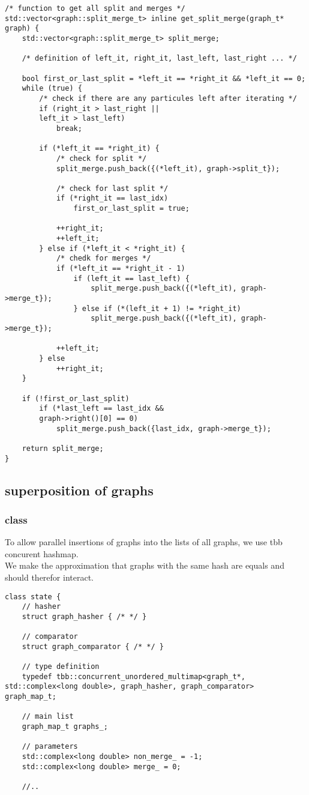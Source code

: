 \documentclass[11pt]{article}
\begin{document}
\begin{lstlisting}[style=CStyle]
/* function to get all split and merges */
std::vector<graph::split_merge_t> inline get_split_merge(graph_t* graph) {
	std::vector<graph::split_merge_t> split_merge;

	/* definition of left_it, right_it, last_left, last_right ... */
	
	bool first_or_last_split = *left_it == *right_it && *left_it == 0;
	while (true) {
		/* check if there are any particules left after iterating */
		if (right_it > last_right ||
		left_it > last_left)
			break;

		if (*left_it == *right_it) {
			/* check for split */
			split_merge.push_back({(*left_it), graph->split_t});

			/* check for last split */
			if (*right_it == last_idx)
				first_or_last_split = true;

			++right_it;
			++left_it;
		} else if (*left_it < *right_it) {
			/* chedk for merges */
			if (*left_it == *right_it - 1)
				if (left_it == last_left) {
					split_merge.push_back({(*left_it), graph->merge_t});
				} else if (*(left_it + 1) != *right_it)
					split_merge.push_back({(*left_it), graph->merge_t});

			++left_it;
		} else
			++right_it;
	}
		
	if (!first_or_last_split)
		if (*last_left == last_idx &&
		graph->right()[0] == 0)
			split_merge.push_back({last_idx, graph->merge_t});

	return split_merge;
}
\end{lstlisting}

\subsection{superposition of graphs}

\subsubsection{class}

To allow parallel insertions of graphs into the lists of all graphs, we use tbb concurent hashmap. \\

We make the approximation that graphs with the same hash are equals and should therefor interact.

\begin{lstlisting}[style=CStyle]
class state {
	// hasher
	struct graph_hasher { /* */ }

	// comparator
	struct graph_comparator { /* */ }

	// type definition
	typedef tbb::concurrent_unordered_multimap<graph_t*, std::complex<long double>, graph_hasher, graph_comparator> graph_map_t;

	// main list 
	graph_map_t graphs_;

	// parameters
	std::complex<long double> non_merge_ = -1;
	std::complex<long double> merge_ = 0;
	
	//..
\end{lstlisting}
\end{document}
